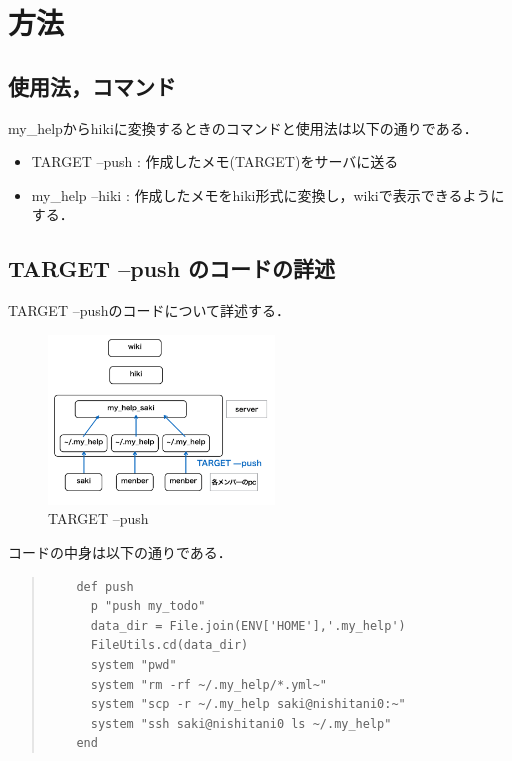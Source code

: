 \section{方法}


\subsection{使用法，コマンド}
my\_helpからhikiに変換するときのコマンドと使用法は以下の通りである．
\begin{itemize}
\item TARGET --push : 作成したメモ(TARGET)をサーバに送る
\end{itemize}  
\begin{itemize}
\item my\_help --hiki : 作成したメモをhiki形式に変換し，wikiで表示できるようにする．
\end{itemize}

\subsection{TARGET --push のコードの詳述}
TARGET --pushのコードについて詳述する．
\begin{figure}[htbp]\begin{center}
\includegraphics[width=6cm,bb=100 100 600 700]{my_help2hiki_saki.012.png}
\caption{TARGET --push}
\label{default}\end{center}\end{figure}

コードの中身は以下の通りである．
\begin{quote}\begin{verbatim}
    def push                             
      p "push my_todo"
      data_dir = File.join(ENV['HOME'],'.my_help')
      FileUtils.cd(data_dir)
      system "pwd"
      system "rm -rf ~/.my_help/*.yml~"
      system "scp -r ~/.my_help saki@nishitani0:~"
      system "ssh saki@nishitani0 ls ~/.my_help" 
    end
\end{verbatim}\end{quote}

